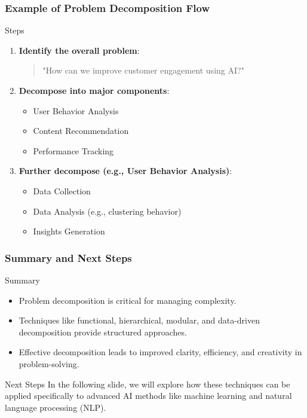 \documentclass[aspectratio=169]{beamer}
\begin{document}
\begin{frame}[fragile]
    \frametitle{Example of Problem Decomposition Flow}
    \begin{block}{Steps}
        \begin{enumerate}
            \item \textbf{Identify the overall problem}: 
                \begin{quote}
                "How can we improve customer engagement using AI?"
                \end{quote}
            \item \textbf{Decompose into major components}: 
                \begin{itemize}
                    \item User Behavior Analysis
                    \item Content Recommendation
                    \item Performance Tracking
                \end{itemize}
            \item \textbf{Further decompose (e.g., User Behavior Analysis)}:
                \begin{itemize}
                    \item Data Collection
                    \item Data Analysis (e.g., clustering behavior)
                    \item Insights Generation
                \end{itemize}
        \end{enumerate}
    \end{block}
\end{frame}

\begin{frame}[fragile]
    \frametitle{Summary and Next Steps}
    \begin{block}{Summary}
        \begin{itemize}
            \item Problem decomposition is critical for managing complexity.
            \item Techniques like functional, hierarchical, modular, and data-driven decomposition provide structured approaches.
            \item Effective decomposition leads to improved clarity, efficiency, and creativity in problem-solving.
        \end{itemize}
    \end{block}
    
    \begin{block}{Next Steps}
        In the following slide, we will explore how these techniques can be applied specifically to advanced AI methods like machine learning and natural language processing (NLP).
    \end{block}
\end{frame}
\end{document}
